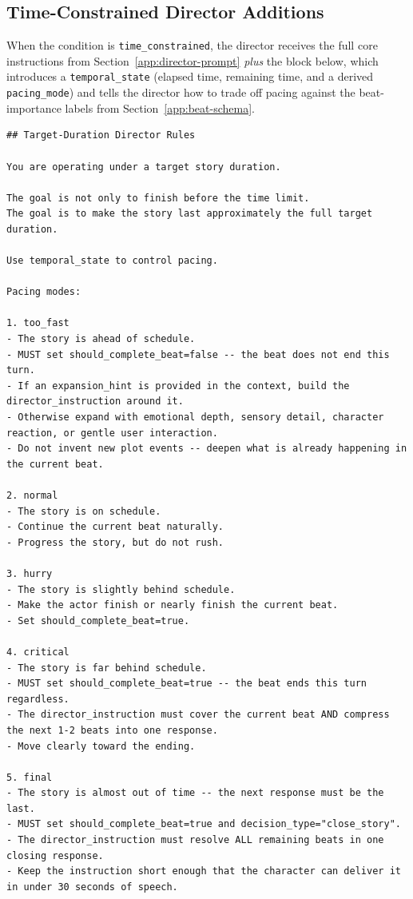 \documentclass[10pt]{article}
\begin{document}
\subsection{Time-Constrained Director Additions}
\label{app:time-constrained-prompt}

When the condition is \texttt{time\_constrained}, the director receives the
full core instructions from Section~\ref{app:director-prompt} \emph{plus}
the block below, which introduces a \texttt{temporal\_state} (elapsed time,
remaining time, and a derived \texttt{pacing\_mode}) and tells the director
how to trade off pacing against the beat-importance labels from
Section~\ref{app:beat-schema}.

\begin{lstlisting}
## Target-Duration Director Rules

You are operating under a target story duration.

The goal is not only to finish before the time limit.
The goal is to make the story last approximately the full target duration.

Use temporal_state to control pacing.

Pacing modes:

1. too_fast
- The story is ahead of schedule.
- MUST set should_complete_beat=false -- the beat does not end this turn.
- If an expansion_hint is provided in the context, build the director_instruction around it.
- Otherwise expand with emotional depth, sensory detail, character reaction, or gentle user interaction.
- Do not invent new plot events -- deepen what is already happening in the current beat.

2. normal
- The story is on schedule.
- Continue the current beat naturally.
- Progress the story, but do not rush.

3. hurry
- The story is slightly behind schedule.
- Make the actor finish or nearly finish the current beat.
- Set should_complete_beat=true.

4. critical
- The story is far behind schedule.
- MUST set should_complete_beat=true -- the beat ends this turn regardless.
- The director_instruction must cover the current beat AND compress the next 1-2 beats into one response.
- Move clearly toward the ending.

5. final
- The story is almost out of time -- the next response must be the last.
- MUST set should_complete_beat=true and decision_type="close_story".
- The director_instruction must resolve ALL remaining beats in one closing response.
- Keep the instruction short enough that the character can deliver it in under 30 seconds of speech.


\end{lstlisting}
\end{document}
